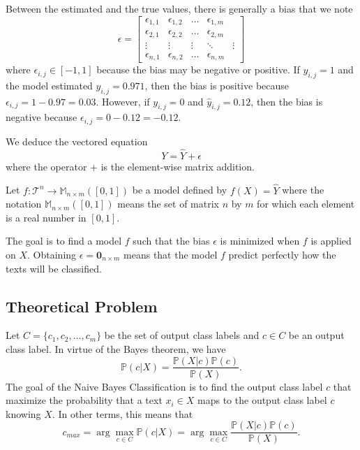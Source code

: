 \documentclass{article}
\begin{document}
Between the estimated and the true values, there is generally a bias that we note
\begin{equation} \label{eq:BiasMatrix}
\epsilon =\begin{bmatrix}
	    \epsilon_{1,1}      & \epsilon_{1,2}      & \ldots & \epsilon_{1,m} \\
	    \epsilon_{2,1} & \epsilon_{2,2} & \ldots & \epsilon_{2,m} \\
	    \vdots       & \vdots       & \vdots        & \ddots & \vdots \\
	    \epsilon_{n,1}  & \epsilon_{n,2}  & \ldots & \epsilon_{n,m}
	\end{bmatrix}
\end{equation}
where $\epsilon_{i,j} \in [-1, 1]$ because the bias may be negative or positive. If $y_{i,j} = 1$ and the model estimated $\widehat{y}_{i,j} = 0.971$, then the bias is positive because $\epsilon_{i,j} = 1 - 0.97 = 0.03$. However, if $y_{i,j} = 0$ and $\widehat{y}_{i,j} = 0.12$, then the bias is negative because $\epsilon_{i,j} = 0 - 0.12 = -0.12$.

We deduce the vectored equation 
\begin{equation}
	Y = \widehat{Y} + \epsilon
\end{equation}
where the operator $+$ is the element-wise matrix addition.

Let $f : \mathcal{T}^n \longrightarrow \mathbb{M}_{n \times m}([0,1])$ be a model defined by $f(X) = \widehat{Y}$ where the notation $\mathbb{M}_{n \times m}([0,1])$ means the set of matrix $n$ by $m$ for which each element is a real number in $[0,1]$.

The goal is to find a model $f$ such that the bias $\epsilon$ is minimized when $f$ is applied on $X$. Obtaining $\epsilon = \mathbf{0}_{n \times m}$ means that the model $f$ predict perfectly how the texts will be classified.


\subsection{Theoretical Problem}
Let $C = \{c_1,c_2,\ldots, c_m\}$ be the set of output class labels and $c \in C$ be an output class label. In virtue of the Bayes theorem, we have
\begin{equation}
	\mathbb{P}(c | X) = \frac{\mathbb{P}(X | c)\mathbb{P}(c)}{\mathbb{P}(X)}.
\end{equation}
The goal of the Naive Bayes Classification is to find the output class label $c$ that maximize the probability that a text $x_i \in X$ maps to the output class label $c$ knowing $X$. In other terms, this means that
\begin{equation}
	c_{max} = \arg\max_{c \in C} \mathbb{P}(c | X) = \arg\max_{c \in C} \frac{\mathbb{P}(X | c)\mathbb{P}(c)}{\mathbb{P}(X)}.
\end{equation}
\end{document}
